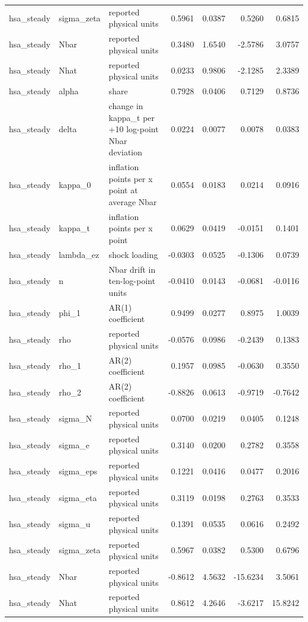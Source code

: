 \begin{tabular}{lllrrrr}
hsa\_steady & sigma\_zeta & reported physical units & 0.5961 & 0.0387 & 0.5260 & 0.6815 \\
hsa\_steady & Nbar & reported physical units & 0.3480 & 1.6540 & -2.5786 & 3.0757 \\
hsa\_steady & Nhat & reported physical units & 0.0233 & 0.9806 & -2.1285 & 2.3389 \\
hsa\_steady & alpha & share & 0.7928 & 0.0406 & 0.7129 & 0.8736 \\
hsa\_steady & delta & change in kappa\_t per +10 log-point Nbar deviation & 0.0224 & 0.0077 & 0.0078 & 0.0383 \\
hsa\_steady & kappa\_0 & inflation points per x point at average Nbar & 0.0554 & 0.0183 & 0.0214 & 0.0916 \\
hsa\_steady & kappa\_t & inflation points per x point & 0.0629 & 0.0419 & -0.0151 & 0.1401 \\
hsa\_steady & lambda\_ez & shock loading & -0.0303 & 0.0525 & -0.1306 & 0.0739 \\
hsa\_steady & n & Nbar drift in ten-log-point units & -0.0410 & 0.0143 & -0.0681 & -0.0116 \\
hsa\_steady & phi\_1 & AR(1) coefficient & 0.9499 & 0.0277 & 0.8975 & 1.0039 \\
hsa\_steady & rho & reported physical units & -0.0576 & 0.0986 & -0.2439 & 0.1383 \\
hsa\_steady & rho\_1 & AR(2) coefficient & 0.1957 & 0.0985 & -0.0630 & 0.3550 \\
hsa\_steady & rho\_2 & AR(2) coefficient & -0.8826 & 0.0613 & -0.9719 & -0.7642 \\
hsa\_steady & sigma\_N & reported physical units & 0.0700 & 0.0219 & 0.0405 & 0.1248 \\
hsa\_steady & sigma\_e & reported physical units & 0.3140 & 0.0200 & 0.2782 & 0.3558 \\
hsa\_steady & sigma\_eps & reported physical units & 0.1221 & 0.0416 & 0.0477 & 0.2016 \\
hsa\_steady & sigma\_eta & reported physical units & 0.3119 & 0.0198 & 0.2763 & 0.3533 \\
hsa\_steady & sigma\_u & reported physical units & 0.1391 & 0.0535 & 0.0616 & 0.2492 \\
hsa\_steady & sigma\_zeta & reported physical units & 0.5967 & 0.0382 & 0.5300 & 0.6796 \\
hsa\_steady & Nbar & reported physical units & -0.8612 & 4.5632 & -15.6234 & 3.5061 \\
hsa\_steady & Nhat & reported physical units & 0.8612 & 4.2646 & -3.6217 & 15.8242 \\

\end{tabular}
